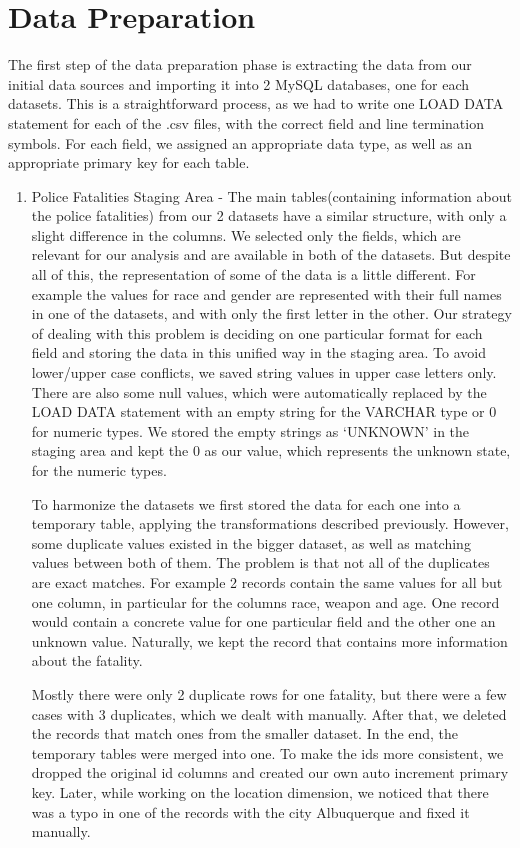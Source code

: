 \documentclass[11pt, journal]{IEEEtran}
\begin{document}
\section{Data Preparation} \label{sec:datapreparation}
The first step of the data preparation phase is extracting the data from our initial data sources and importing it into 2 MySQL databases, one for each datasets. This is a straightforward process, as we had to write one LOAD DATA statement for each of the .csv files, with the correct field and line termination symbols. For each field, we assigned an appropriate data type, as well as an appropriate primary key for each table. 
\begin{enumerate}
\item Police Fatalities Staging Area - The main tables(containing information about the police fatalities)  from our 2 datasets have a similar structure, with only a slight difference in the columns. We selected only the fields, which are relevant for our analysis and are available in both of the datasets. But despite all of this, the representation of some of the data is a little different. For example the values for race and gender are represented with their full names in one of the datasets, and with only the first letter in the other. Our strategy of dealing with this problem is deciding on one particular format for each field and storing the data in this unified way in the staging area. To avoid lower/upper case conflicts, we saved string values in upper case letters only. There are also some null values, which were automatically replaced by the LOAD DATA statement with an empty string for the VARCHAR type or 0 for numeric types. We stored the empty strings as ‘UNKNOWN’ in the staging area and kept the 0 as our value, which represents the unknown state, for the numeric types.

To harmonize the datasets we first stored the data for each one into a temporary table, applying the transformations described  previously. However, some duplicate values existed in the bigger dataset, as well as matching values between both of them. The problem is that not all of the duplicates are exact matches. For example 2 records contain the same values for all but one column, in particular for the columns race, weapon and age. One record would contain a concrete value for one particular field and the other one an unknown value. Naturally, we kept the record that contains more information about the fatality. 

Mostly there were only 2 duplicate rows for one fatality, but there were a few cases with 3 duplicates, which we dealt with manually. After that, we deleted the records that match ones from the smaller dataset. In the end, the temporary tables were merged into one. To make the ids more consistent, we dropped the original id columns and created our own auto increment primary key. Later, while working on the location dimension, we noticed that there was a typo in one of the records with the city Albuquerque and fixed it manually.


\end{enumerate}
\end{document}
